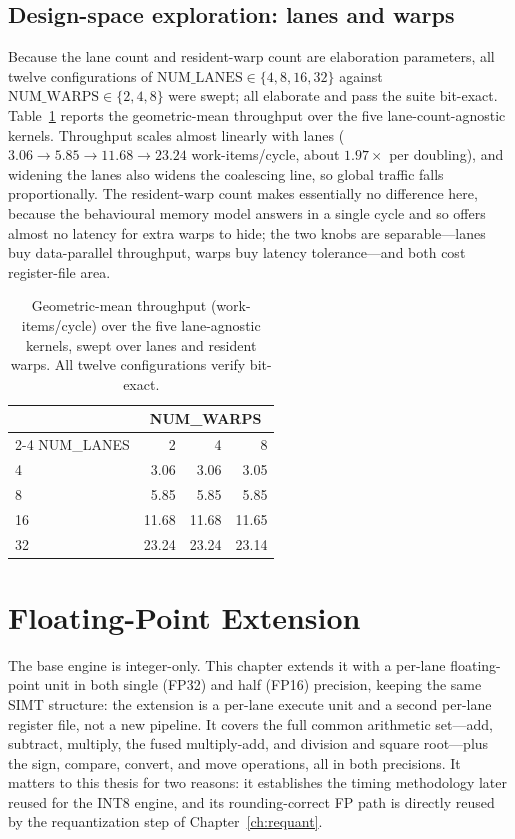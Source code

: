 \documentclass[12pt,a4paper,oneside]{report}
\begin{document}
\section{Design-space exploration: lanes and warps}
\label{sec:dse}
Because the lane count and resident-warp count are elaboration parameters, all
twelve configurations of $\mathrm{NUM\_LANES}\in\{4,8,16,32\}$ against
$\mathrm{NUM\_WARPS}\in\{2,4,8\}$ were swept; all elaborate and pass the suite
bit-exact. Table~\ref{tab:dse} reports the geometric-mean throughput over the five
lane-count-agnostic kernels. Throughput scales almost linearly with lanes
($3.06\rightarrow5.85\rightarrow11.68\rightarrow23.24$ work-items/cycle, about
$1.97\times$ per doubling), and widening the lanes also widens the coalescing
line, so global traffic falls proportionally. The resident-warp count makes
essentially no difference here, because the behavioural memory model answers in a
single cycle and so offers almost no latency for extra warps to hide; the two
knobs are separable---lanes buy data-parallel throughput, warps buy latency
tolerance---and both cost register-file area.

\begin{table}[t]
\caption{Geometric-mean throughput (work-items/cycle) over the five lane-agnostic
kernels, swept over lanes and resident warps. All twelve configurations verify
bit-exact.}
\label{tab:dse}
\centering
\small
\begin{tabular}{lrrr}
\toprule
& \multicolumn{3}{c}{NUM\_WARPS}\\
\cmidrule(lr){2-4}
NUM\_LANES & 2 & 4 & 8\\
\midrule
4  & 3.06  & 3.06  & 3.05\\
8  & 5.85  & 5.85  & 5.85\\
16 & 11.68 & 11.68 & 11.65\\
32 & 23.24 & 23.24 & 23.14\\
\bottomrule
\end{tabular}
\end{table}

\chapter{Floating-Point Extension}
\label{ch:fp}

The base engine is integer-only. This chapter extends it with a per-lane
floating-point unit in both single (FP32) and half (FP16) precision, keeping the
same SIMT structure: the extension is a per-lane execute unit and a second
per-lane register file, not a new pipeline. It covers the full common arithmetic
set---add, subtract, multiply, the fused multiply-add, and division and square
root---plus the sign, compare, convert, and move operations, all in both
precisions. It matters to this thesis for two reasons: it establishes the timing
methodology later reused for the INT8 engine, and its rounding-correct FP path is
directly reused by the requantization step of Chapter~\ref{ch:requant}.
\end{document}
